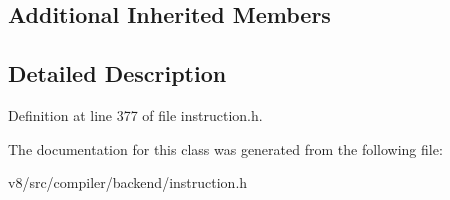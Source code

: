 \subsection*{Additional Inherited Members}


\subsection{Detailed Description}


Definition at line 377 of file instruction.\+h.



The documentation for this class was generated from the following file\+:\begin{DoxyCompactItemize}
\item 
v8/src/compiler/backend/instruction.\+h\end{DoxyCompactItemize}
